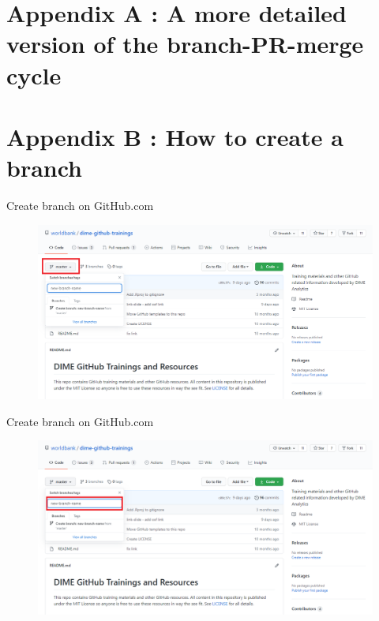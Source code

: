 \documentclass[aspectratio=169]{beamer} %
\begin{document}




\section{Appendix A : A more detailed version of the branch-PR-merge cycle }

\section{Appendix B : How to create a branch}

\begin{frame}{Create branch on GitHub.com}
\label{new-branch}

\begin{figure}
	\centering
	\includegraphics[width=.9\textwidth]{./img/new-branch-1.png}
\end{figure}
\end{frame}

\begin{frame}{Create branch on GitHub.com}
\begin{figure}
	\centering
	\includegraphics[width=.9\textwidth]{./img/new-branch-2.png}
\end{figure}
\end{frame}
\end{document}
